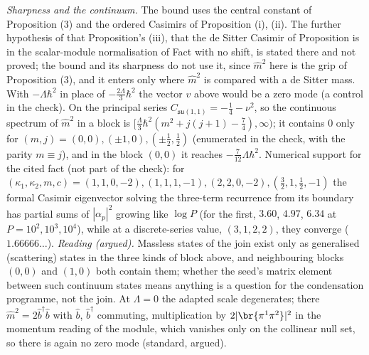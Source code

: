 \emph{Sharpness and the continuum.} The bound uses the central constant of Proposition (3) and the ordered Casimirs of Proposition (i), (ii). The further hypothesis of that Proposition's (iii), that the de Sitter Casimir of Proposition  is in the scalar-module normalisation of Fact  with no shift, is stated there and not proved; the bound and its sharpness do not use it, since $\hat m^{2}$ here is the grip of Proposition (3), and it enters only where $\hat m^{2}$ is compared with a de Sitter mass. With $-\Lambda\hbar^{2}$ in place of $-\tfrac{2\Lambda}{3}\hbar^{2}$ the vector $v$ above would be a zero mode (a control in the check). On the principal series $C_{\mathfrak{su}(1,1)} = -\tfrac14 - \nu^{2}$, so the continuous spectrum of $\hat m^{2}$ in a block is $[\tfrac{\Lambda}{3}\hbar^{2}(m^{2} + j(j+1) - \tfrac74), \infty)$; it contains $0$ only for $(m, j) = (0, 0), (\pm1, 0), (\pm\tfrac12, \tfrac12)$ (enumerated in the check, with the parity $m \equiv j$), and in the block $(0, 0)$ it reaches $-\tfrac{7}{12}\Lambda\hbar^{2}$. Numerical support for the cited fact (not part of the check): for $(\kappa_{1}, \kappa_{2}, m, c) = (1, 1, 0, -2), (1, 1, 1, -1), (2, 2, 0, -2), (\tfrac32, 1, \tfrac12, -1)$ the formal Casimir eigenvector solving the three-term recurrence from its boundary has partial sums of $|\alpha_{p}|^{2}$ growing like $\log P$ (for the first, $3.60$, $4.97$, $6.34$ at $P = 10^{2}, 10^{3}, 10^{4}$), while at a discrete-series value, $(3, 1, 2, 2)$, they converge ($1.66666\ldots$). \emph{Reading (argued).} Massless states of the join exist only as generalised (scattering) states in the three kinds of block above, and neighbouring blocks $(0, 0)$ and $(1, 0)$ both contain them; whether the seed's matrix element between such continuum states means anything is a question for the condensation programme, not the join. At $\Lambda = 0$ the adapted scale degenerates; there $\hat m^{2} = 2\hat b^{\dagger}\hat b$ with $\hat b$, $\hat b^{\dagger}$ commuting, multiplication by $2|\br{\pi^{1}\pi^{2}}|^{2}$ in the momentum reading of the module, which vanishes only on the collinear null set, so there is again no zero mode (standard, argued).
